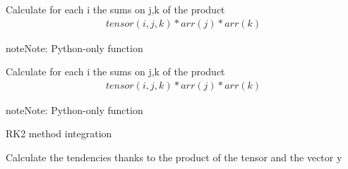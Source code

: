 \documentclass[letterpaper,10pt,english]{sphinxmanual}
\begin{document}
\begin{fulllineitems}
\label{rstfiles/integrator:integrator.sparse_mul3}
Calculate for each i the sums on j,k of the product
\begin{equation*}
\begin{split}tensor(i,j,k)* arr(j) * arr(k)\end{split}
\end{equation*}
\begin{notice}{note}{Note:}
Python-only function
\end{notice}

\end{fulllineitems}


\begin{fulllineitems}
\label{rstfiles/integrator:integrator.sparse_mul3_py}
Calculate for each i the sums on j,k of the product
\begin{equation*}
\begin{split}tensor(i,j,k)* arr(j) * arr(k)\end{split}
\end{equation*}
\begin{notice}{note}{Note:}
Python-only function
\end{notice}

\end{fulllineitems}


\begin{fulllineitems}
\label{rstfiles/integrator:integrator.step}
RK2 method integration

\end{fulllineitems}


\begin{fulllineitems}
\label{rstfiles/integrator:integrator.tendencies}
Calculate the tendencies thanks to the product of the tensor and     the vector y

\end{fulllineitems}
\end{document}
